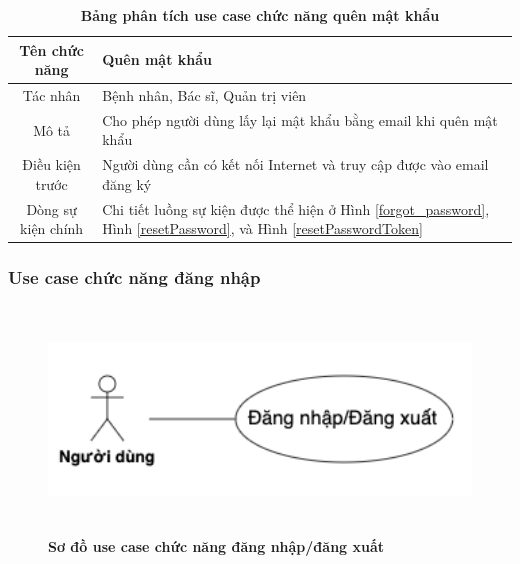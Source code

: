   \begin{table}[H]
    \caption{\bfseries \fontsize{12pt}{0pt}\selectfont Bảng phân tích use case chức năng quên mật khẩu}
    \centering
    \begin{tabularx}{0.9\textwidth}{|c|X|}
      \hline
      \textbf{Tên chức năng} & \textbf{Quên mật khẩu} \\
      \hline
      Tác nhân & Bệnh nhân, Bác sĩ, Quản trị viên \\
      \hline
      Mô tả & Cho phép người dùng lấy lại mật khẩu bằng email khi quên mật khẩu \\
      \hline
      Điều kiện trước & Người dùng cần có kết nối Internet và truy cập được vào email đăng ký \\
      \hline
      Dòng sự kiện chính & 
        Chi tiết luồng sự kiện được thể hiện ở Hình \ref{forgot_password}, Hình \ref{resetPassword}, và Hình \ref{resetPasswordToken}\\
      \hline
    \end{tabularx}
  \end{table}

\subsubsection{Use case chức năng đăng nhập}
  \begin{figure}[H]
    \centering
    \includegraphics[width=15cm,height=6cm]{Images/use_case/use_case_login.png}
    \caption[Sơ đồ use case chức năng đăng nhập/đăng xuất]{\bfseries \fontsize{12pt}{0pt}
    \selectfont Sơ đồ use case chức năng đăng nhập/đăng xuất}
    \label{use_case_login} %
  \end{figure}

